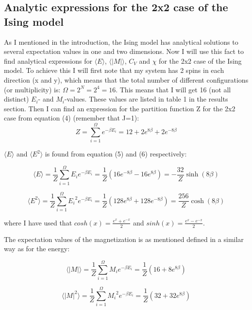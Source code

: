 \documentclass[twocolumn]{article}
\begin{document}
\subsection{Analytic expressions for the 2x2 case of the Ising model}
As I mentioned in the introduction, the Ising model has analytical solutions to several expectation values in one and two dimensions. Now I will use this fact to find analytical expressions for $\langle E \rangle$, $\langle |M| \rangle$, $C_V$ and $\chi$ for the 2x2 case of the Ising model. To achieve this I will first note that my system has 2 spins in each direction (x and y), which means that the total number of different configurations (or multiplicity) is: $\Omega = 2^N = 2^4 = 16$. This means that I will get 16 (not all distinct) $E_i$- and $M_i$-values. These values are listed in table 1 in the results section.\newline
Then I can find an expression for the partition function Z for the 2x2 case from equation (4) (remember that J=1):
\begin{equation}
    Z = \sum_{i=1}^{\Omega}e^{-\beta E_i} = 12 + 2e^{8\beta} + 2e^{-8\beta}
\end{equation}

$\langle E \rangle$ and $\langle E^2 \rangle$ is found from equation (5) and (6) respectively:

\begin{equation}
    \langle E \rangle = \frac{1}{Z}\sum_{i=1}^{\Omega}E_i e^{-\beta E_i} = \frac{1}{Z}(16e^{-8\beta} - 16e^{8\beta}) = -\frac{32}{Z}\sinh(8\beta)
\end{equation}

\begin{equation}
    \langle E^2 \rangle = \frac{1}{Z}\sum_{i=1}^{\Omega}{E_i}^2 e^{-\beta E_i} = \frac{1}{Z}( 128e^{8\beta} + 128e^{-8\beta} ) = \frac{256}{Z}\cosh(8\beta)
\end{equation}

where I have used that $cosh(x)=\frac{e^x + e^{-x}}{2}$ and $sinh(x)=\frac{e^x - e^{-x}}{2}$.

The expectation values of the magnetization is as mentioned defined in a similar way as for the energy:

\begin{equation}
    \langle |M| \rangle = \frac{1}{Z}\sum_{i=1}^{\Omega}M_i e^{-\beta E_i} = \frac{1}{Z}( 16 + 8e^{8\beta} )
\end{equation}

\begin{equation}
    \langle |M|^2 \rangle = \frac{1}{Z}\sum_{i=1}^{\Omega}{M_i}^2 e^{-\beta E_i} = \frac{1}{Z}( 32 + 32e^{8\beta} )
\end{equation}
\end{document}
